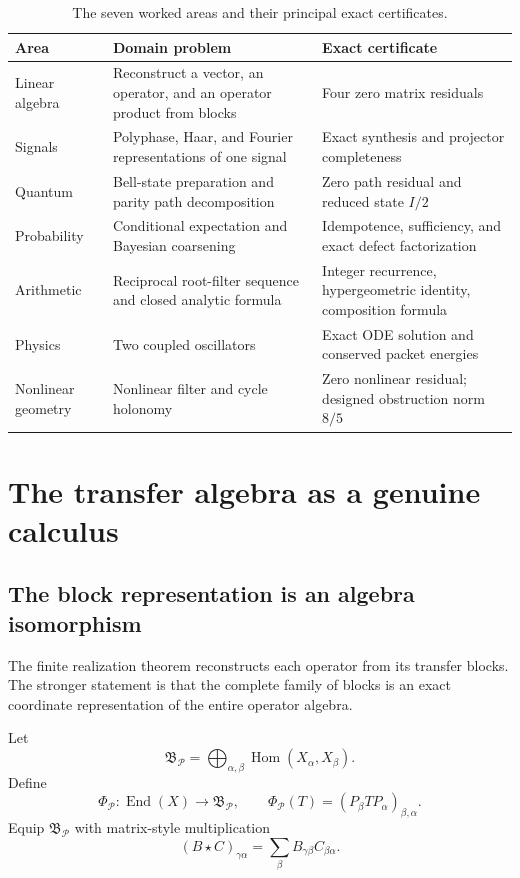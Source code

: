 \documentclass[11pt,oneside]{book}
\theoremstyle{definition}
\theoremstyle{remark}
\begin{document}
\begin{table}[H]
\centering
\caption{The seven worked areas and their principal exact certificates.}
\begin{tabularx}{\linewidth}{L{1.45in}Y Y}
\toprule
Area & Domain problem & Exact certificate \\
\midrule
Linear algebra & Reconstruct a vector, an operator, and an operator product from blocks & Four zero matrix residuals \\
Signals & Polyphase, Haar, and Fourier representations of one signal & Exact synthesis and projector completeness \\
Quantum & Bell-state preparation and parity path decomposition & Zero path residual and reduced state $I/2$ \\
Probability & Conditional expectation and Bayesian coarsening & Idempotence, sufficiency, and exact defect factorization \\
Arithmetic & Reciprocal root-filter sequence and closed analytic formula & Integer recurrence, hypergeometric identity, composition formula \\
Physics & Two coupled oscillators & Exact ODE solution and conserved packet energies \\
Nonlinear geometry & Nonlinear filter and cycle holonomy & Zero nonlinear residual; designed obstruction norm $8/5$ \\
\bottomrule
\end{tabularx}
\end{table}

\chapter{The transfer algebra as a genuine calculus}\label{ch:transfer-calculus}

\section{The block representation is an algebra isomorphism}
The finite realization theorem reconstructs each operator from its transfer blocks.  The stronger statement is that the complete family of blocks is an exact coordinate representation of the entire operator algebra.

Let
\[
\mathfrak B_{\mathcal P}
=
\bigoplus_{\alpha,\beta}
\operatorname{Hom}(X_\alpha,X_\beta).
\]
Define
\[
\Phi_{\mathcal P}:\operatorname{End}(X)\longrightarrow\mathfrak B_{\mathcal P},
\qquad
\Phi_{\mathcal P}(T)=(P_\beta TP_\alpha)_{\beta,\alpha}.
\]
Equip $\mathfrak B_{\mathcal P}$ with matrix-style multiplication
\[
(B\star C)_{\gamma\alpha}
=
\sum_\beta B_{\gamma\beta}C_{\beta\alpha}.
\]
\end{document}
